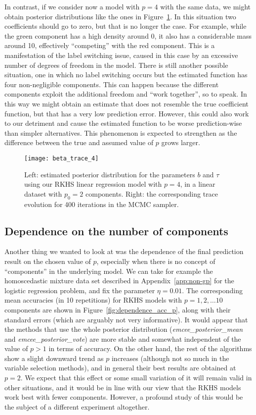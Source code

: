 In contrast, if we consider now a model with \(p=4\) with the same data, we might obtain posterior distributions like the ones in Figure~\ref{fig:beta_trace_4}. In this situation two coefficients should go to zero, but that is no longer the case. For example, while the green component has a high density around 0, it also has a considerable mass around 10, effectively ``competing'' with the red component. This is a manifestation of the label switching issue, caused in this case by an excessive number of degrees of freedom in the model. There is still another possible situation, one in which no label switching occurs but the estimated function has four non-negligible components. This can happen because the different components exploit the additional freedom and ``work together'', so to speak. In this way we might obtain an estimate that does not resemble the true coefficient function, but that has a very low prediction error. However, this could also work to our detriment and cause the estimated function to be worse prediction-wise than simpler alternatives. This phenomenon is expected to strengthen as the difference between the true and assumed value of \(p\) grows larger.

\begin{figure}[ht!]
    \centering
    \texttt{[image: beta\_trace\_4]}
    \caption{Left: estimated posterior distribution for the parameters \(b\) and \(\tau\) using our RKHS linear regression model with \(p=4\), in a linear dataset with \(p_0=2\) components. Right: the corresponding trace evolution for 400 iterations in the MCMC sampler.}\label{fig:beta_trace_4}
\end{figure}

\subsection{Dependence on the number of components}

Another thing we wanted to look at was the dependence of the final prediction result on the chosen value of \(p\), especially when there is no concept of ``components'' in the underlying model. We can take for example the homoscedastic mixture data set described in Appendix~\ref{app:non-gp} for the logistic regression problem, and fix the parameter \(\eta=0.01\). The corresponding mean accuracies (in 10 repetitions) for RKHS models with \(p=1,2,\dots 10\) components are shown in Figure~\ref{fig:dependence_acc_p}, along with their standard errors (which are arguably not very informative). It would appear that the methods that use the whole posterior distribution (\textit{emcee\_posterior\_mean} and \textit{emcee\_posterior\_vote}) are more stable and somewhat independent of the value of \(p>1\) in terms of accuracy. On the other hand, the rest of the algorithms show a slight downward trend as \(p\) increases (although not so much in the variable selection methods), and in general their best results are obtained at \(p=2\). We expect that this effect or some small variation of it will remain valid in other situations, and it would be in line with our view that the RKHS models work best with fewer components. However, a profound study of this would be the subject of a different experiment altogether.

